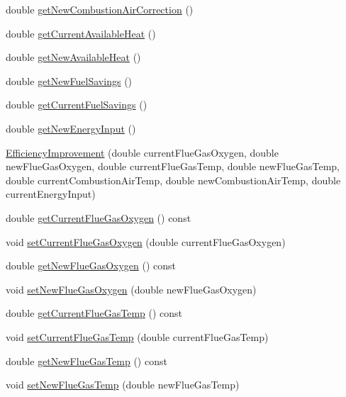 \begin{DoxyCompactItemize}
double \hyperlink{class_efficiency_improvement_abcbe174b3f94a20679dff0f5bff6a330}{get\+New\+Combustion\+Air\+Correction} ()
\item 
double \hyperlink{class_efficiency_improvement_a4f1ef470ee88c9d3ac05be0bd5755157}{get\+Current\+Available\+Heat} ()
\item 
double \hyperlink{class_efficiency_improvement_a37df0eb5d1dc43627e947a610f2a9c08}{get\+New\+Available\+Heat} ()
\item 
double \hyperlink{class_efficiency_improvement_a1b85007b7b046b998443f5eb267822f9}{get\+New\+Fuel\+Savings} ()
\item 
double \hyperlink{class_efficiency_improvement_ab2e940be7192df960c9eb9578096796f}{get\+Current\+Fuel\+Savings} ()
\item 
double \hyperlink{class_efficiency_improvement_a3c31caaed812edb8c465b53dc9029810}{get\+New\+Energy\+Input} ()
\item 
\hyperlink{class_efficiency_improvement_a84e4463e307cd280360a4dfbbb369c55}{Efficiency\+Improvement} (double current\+Flue\+Gas\+Oxygen, double new\+Flue\+Gas\+Oxygen, double current\+Flue\+Gas\+Temp, double new\+Flue\+Gas\+Temp, double current\+Combustion\+Air\+Temp, double new\+Combustion\+Air\+Temp, double current\+Energy\+Input)
\item 
double \hyperlink{class_efficiency_improvement_a8b66a676d696f7a9fcc8fa987371d80b}{get\+Current\+Flue\+Gas\+Oxygen} () const
\item 
void \hyperlink{class_efficiency_improvement_a038c378d51a5baf96521012a572bb106}{set\+Current\+Flue\+Gas\+Oxygen} (double current\+Flue\+Gas\+Oxygen)
\item 
double \hyperlink{class_efficiency_improvement_a46dbfa28b53f36de80dd730c07b294f1}{get\+New\+Flue\+Gas\+Oxygen} () const
\item 
void \hyperlink{class_efficiency_improvement_a111f7e30d302b4e71103a2ec6d199e2c}{set\+New\+Flue\+Gas\+Oxygen} (double new\+Flue\+Gas\+Oxygen)
\item 
double \hyperlink{class_efficiency_improvement_a27e97b5c7aad8aa6b4d02e18354d2292}{get\+Current\+Flue\+Gas\+Temp} () const
\item 
void \hyperlink{class_efficiency_improvement_aef6ffeae5135982ef223ce4a5efe23d8}{set\+Current\+Flue\+Gas\+Temp} (double current\+Flue\+Gas\+Temp)
\item 
double \hyperlink{class_efficiency_improvement_a4de84ef27e3b4c518319fea77d039845}{get\+New\+Flue\+Gas\+Temp} () const
\item 
void \hyperlink{class_efficiency_improvement_ab88d3976fca8f55bb1fd3278bc427fc1}{set\+New\+Flue\+Gas\+Temp} (double new\+Flue\+Gas\+Temp)

\end{DoxyCompactItemize}
